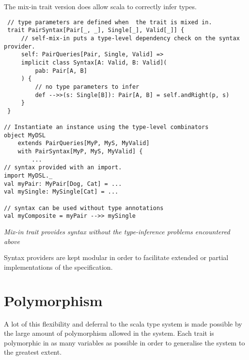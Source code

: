 \documentclass{report}
\newcommand \2[0]{\textbf{2}}
\newcommand \3[0]{\textbf{3}}
\begin{document}
The mix-in trait version does allow scala to correctly infer types.
\begin{framed}
    \begin{framed}
        \begin{verbatim}
 // type parameters are defined when  the trait is mixed in.
 trait PairSyntax[Pair[_, _], Single[_], Valid[_]] {
     // self-mix-in puts a type-level dependency check on the syntax provider.
     self: PairQueries[Pair, Single, Valid] => 
     implicit class Syntax[A: Valid, B: Valid](
         pab: Pair[A, B]
     ) {
         // no type parameters to infer
         def -->>(s: Single[B]): Pair[A, B] = self.andRight(p, s)
     }
 }
            
// Instantiate an instance using the type-level combinators
object MyDSL
    extends PairQueries[MyP, MyS, MyValid] 
    with PairSyntax[MyP, MyS, MyValid] {
        ...   
// syntax provided with an import.
import MyDSL._
val myPair: MyPair[Dog, Cat] = ...
val mySingle: MySingle[Cat] = ...
            
// syntax can be used without type annotations
val myComposite = myPair -->> mySingle
            \end{verbatim}
    \end{framed}
    \textit{Mix-in trait provides syntax without the type-inference problems encountered above}
\end{framed}



Syntax providers are kept modular in order to facilitate extended or partial implementations of the specification. 


\section{Polymorphism}
A lot of this flexibility and deferral to the scala type system is made possible by the large amount of polymorphism allowed in the system. Each trait is polymorphic in as many variables as possible in order to generalise the system to the greatest extent.
\end{document}
